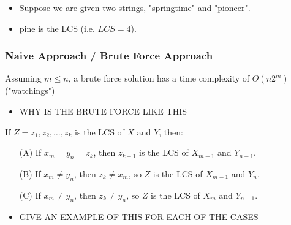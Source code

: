 \begin{example}
    \begin{itemize}
        \item Suppose we are given two strings, "springtime" and "pioneer". 
        \item pine is the LCS (i.e. $LCS=4$).
    \end{itemize}
\end{example}

\subsubsection{Naive Approach / Brute Force Approach}
\begin{intuition}
    Assuming \(m \leq n\), a brute force solution has a time complexity of \(\Theta(n 2^m)\) ("watchings")
    \begin{itemize}
        \item WHY IS THE BRUTE FORCE LIKE THIS
    \end{itemize}
\end{intuition}

\begin{theorem}
If \(Z = z_1, z_2, \dots, z_k\) is the LCS of \(X\) and \(Y\), then:
\begin{itemize}
    \item[(A)] If \(x_m = y_n = z_k\), then \(z_{k-1}\) is the LCS of \(X_{m-1}\) and \(Y_{n-1}\).
    \item[(B)] If \(x_m \neq y_n\), then \(z_k \neq x_m\), so \(Z\) is the LCS of \(X_{m-1}\) and \(Y_n\).
    \item[(C)] If \(x_m \neq y_n\), then \(z_k \neq y_n\), so \(Z\) is the LCS of \(X_m\) and \(Y_{n-1}\).
\end{itemize}
\end{theorem}

\begin{intuition}
    \begin{itemize}
        \item GIVE AN EXAMPLE OF THIS FOR EACH OF THE CASES
    \end{itemize}
\end{intuition}

